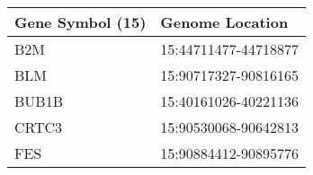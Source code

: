 \begin{tabular}{ll}
\toprule
Gene Symbol (15) &      Genome Location \\
\midrule
             B2M & 15:44711477-44718877 \\
             BLM & 15:90717327-90816165 \\
           BUB1B & 15:40161026-40221136 \\
           CRTC3 & 15:90530068-90642813 \\
             FES & 15:90884412-90895776 \\
\bottomrule
\end{tabular}
